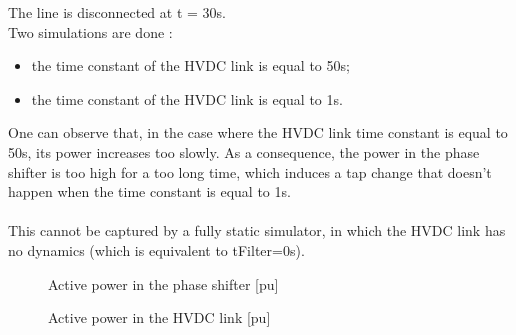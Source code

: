 \documentclass[a4paper, 12pt]{report}
\begin{document}
The line is disconnected at t = 30s.\\
Two simulations are done :
\begin{itemize}
\item the time constant of the HVDC link is equal to 50s;
\item the time constant of the HVDC link is equal to 1s.
\end{itemize}

One can observe that, in the case where the HVDC link time constant is equal to 50s, its power increases too slowly. As a consequence, the power in the phase shifter is too high for a too long time, which induces a tap change that doesn't happen when the time constant is equal to 1s.\\
\\
This cannot be captured by a fully static simulator, in which the HVDC link has no dynamics (which is equivalent to tFilter=0s).

\begin{figure}[H]
  \caption{Active power in the phase shifter [pu]}
\end{figure}

\begin{figure}[H]
  \caption{Active power in the HVDC link [pu]}
\end{figure}
\end{document}
